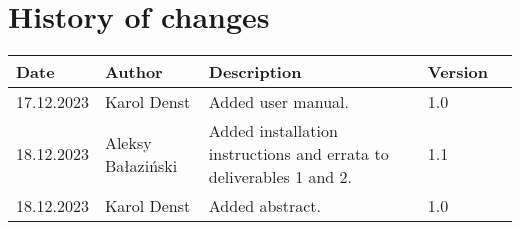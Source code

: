 \section{History of changes}
\begin{table}[H]
    \centering
    \begin{tabular}{lllll}
        \hline
        Date       & Author                                                                  & Description                          & Version & \\ \hline
        17.12.2023 & Karol Denst                                                             & Added user manual.                   & 1.0     & \\
        18.12.2023 & Aleksy Bałaziński                                                       & Added installation instructions and errata to deliverables 1 and 2.     & 1.1     & \\
        18.12.2023 & Karol Denst                                                             & Added abstract.                      & 1.0     & \\ \hline
    \end{tabular}
\end{table}